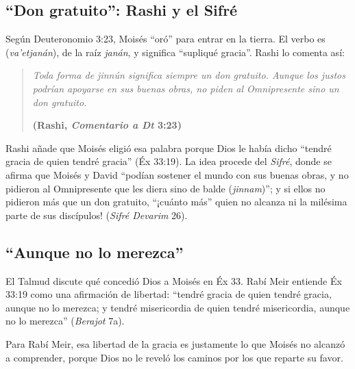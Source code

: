 \subsection{“Don gratuito”: Rashi y el Sifré}
Según Deuteronomio 3:23, Moisés ``oró'' para entrar en la tierra. El verbo es  (\emph{va'etjanán}), de la raíz \emph{janán}, y significa ``supliqué gracia''. Rashi lo comenta así:

\begin{quote}\itshape
Toda forma de \emph{jinnún} significa siempre un don gratuito. Aunque los justos podrían apoyarse en sus buenas obras, no piden al Omnipresente sino un don gratuito.\par\hfill{\upshape\small\bfseries\textcolor{azulp}{(Rashi, \emph{Comentario a Dt} 3:23)}}
\end{quote}

Rashi añade que Moisés eligió esa palabra porque Dios le había dicho ``tendré gracia de quien tendré gracia'' (Éx 33:19). La idea procede del \emph{Sifré}, donde se afirma que Moisés y David ``podían sostener el mundo con sus buenas obras, y no pidieron al Omnipresente que les diera sino de balde (\emph{jinnam})''; y si ellos no pidieron más que un don gratuito, ``¡cuánto más'' quien no alcanza ni la milésima parte de sus discípulos! (\emph{Sifré Devarim} 26).


\subsection{“Aunque no lo merezca”}
El Talmud discute qué concedió Dios a Moisés en Éx 33. Rabí Meir entiende Éx 33:19 como una afirmación de libertad: ``tendré gracia de quien tendré gracia, aunque no lo merezca; y tendré misericordia de quien tendré misericordia, aunque no lo merezca'' (\emph{Berajot} 7a).


Para Rabí Meir, esa libertad de la gracia es justamente lo que Moisés no alcanzó a comprender, porque Dios no le reveló los caminos por los que reparte su favor.

